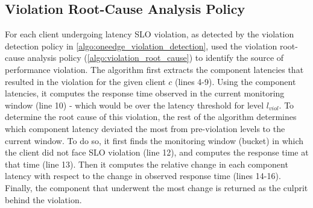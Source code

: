 \subsection{Violation Root-Cause Analysis Policy}
For each client undergoing latency SLO violation, as detected by the violation detection policy in \cref{algo:oneedge_violation_detection}, \oneedge{} used the violation root-cause analysis policy (\cref{algo:violation_root_cause}) to identify the source of performance violation. The algorithm first extracts the component latencies that resulted in the violation for the given client $c$ (lines 4-9). Using the component latencies, it computes the response time observed in the current monitoring window (line 10) - which would be over the latency threshold for level $l_{viol}$. To determine the root cause of this violation, the rest of the algorithm determines which component latency deviated the most from pre-violation levels to the current window. To do so, it first finds the monitoring window (bucket) in which the client did not face SLO violation (line 12), and computes the response time at that time (line 13). Then it computes the relative change in each component latency with respect to the change in observed response time (lines 14-16). Finally, the component that underwent the most change is returned as the culprit behind the violation.
